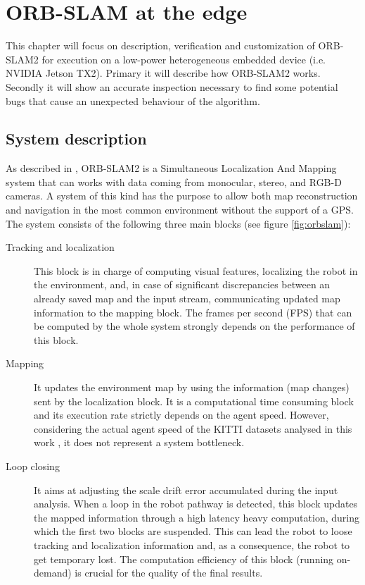 \chapter{ORB-SLAM at the edge} \label{chap:verification}
This chapter will focus on description, verification and customization of ORB-SLAM2 \cite{murORB2} for execution on a low-power heterogeneous embedded device (i.e. NVIDIA Jetson TX2). Primary it will describe how ORB-SLAM2 works. Secondly it will show an accurate inspection necessary to find some potential bugs that cause an unexpected behaviour of the algorithm.

 \section{System description}
 As described in \cite{iros2019}, ORB-SLAM2 is a Simultaneous Localization And Mapping system that can works with data coming from monocular, stereo, and RGB-D cameras. A system of this kind has the purpose to allow both map reconstruction and navigation in the most common environment without the support of a GPS.
 The system consists of the following three main blocks (see figure \ref{fig:orbslam}):

\begin{description}
	\item[Tracking and localization] 
	This block is in charge of computing visual features, localizing the robot in the environment, and, in case of significant discrepancies between an already saved map and the input stream, communicating updated map information to the mapping block. The frames per second (FPS) that can be computed by the whole system strongly depends on the performance of this block.
	\item[Mapping] 
	It updates the environment map by using the information (map changes) sent by the localization block. It is a computational time consuming block and its execution rate strictly depends on the agent speed. However, considering the actual agent speed of the KITTI datasets analysed in this work \cite{CVPR2012}, it does not represent a system bottleneck.
	\item[Loop closing] 
	It aims at adjusting the scale drift error accumulated during the input analysis. When a loop in the robot pathway is detected, this block updates the mapped information through a high latency heavy computation, during which the first two blocks are suspended. This can lead the robot to loose tracking and localization information and, as a consequence, the robot to get temporary lost. The computation efficiency of this block (running on-demand) is crucial for the quality of the final results.
\end{description}

